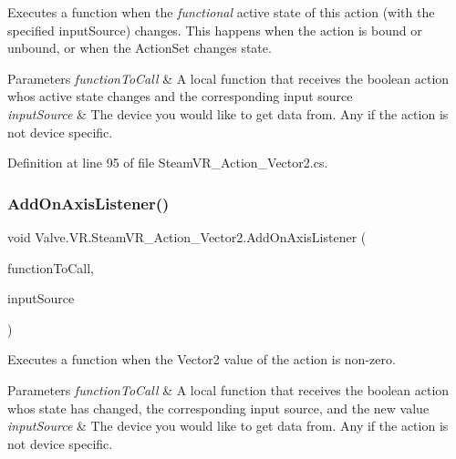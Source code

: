 Executes a function when the {\itshape functional} active state of this action (with the specified input\+Source) changes. This happens when the action is bound or unbound, or when the Action\+Set changes state. 


\begin{DoxyParams}{Parameters}
{\em function\+To\+Call} & A local function that receives the boolean action who\textquotesingle{}s active state changes and the corresponding input source\\
\hline
{\em input\+Source} & The device you would like to get data from. Any if the action is not device specific.\\
\hline
\end{DoxyParams}


Definition at line 95 of file Steam\+V\+R\+\_\+\+Action\+\_\+\+Vector2.\+cs.

\mbox{\label{class_valve_1_1_v_r_1_1_steam_v_r___action___vector2_a52cf0999c3cb5f377a61d9b29189cfdd}} 
\subsubsection{\texorpdfstring{AddOnAxisListener()}{AddOnAxisListener()}}
{\footnotesize\ttfamily void Valve.\+V\+R.\+Steam\+V\+R\+\_\+\+Action\+\_\+\+Vector2.\+Add\+On\+Axis\+Listener (\begin{DoxyParamCaption}\item[{\mbox{\hyperlink{class_valve_1_1_v_r_1_1_steam_v_r___action___vector2_a11d8b99df804d185a33c7c60791ef426}{Axis\+Handler}}}]{function\+To\+Call,  }\item[{\mbox{\hyperlink{namespace_valve_1_1_v_r_a82e5bf501cc3aa155444ee3f0662853f}{Steam\+V\+R\+\_\+\+Input\+\_\+\+Sources}}}]{input\+Source }\end{DoxyParamCaption})}



Executes a function when the Vector2 value of the action is non-\/zero. 


\begin{DoxyParams}{Parameters}
{\em function\+To\+Call} & A local function that receives the boolean action who\textquotesingle{}s state has changed, the corresponding input source, and the new value\\
\hline
{\em input\+Source} & The device you would like to get data from. Any if the action is not device specific.\\
\hline
\end{DoxyParams}



